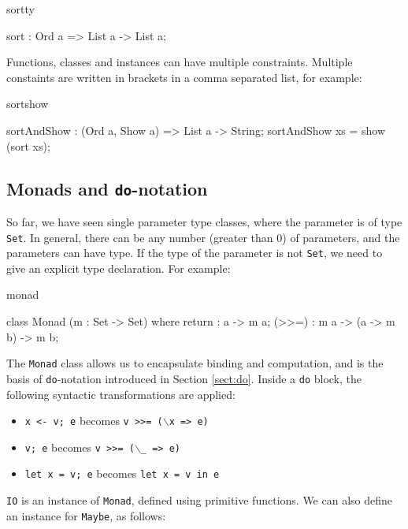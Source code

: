\begin{SaveVerbatim}{sortty}

sort : Ord a => List a -> List a;

\end{SaveVerbatim}

\noindent
Functions, classes and instances can have multiple constraints. Multiple constaints are
written in brackets in a comma separated list, for example:

\begin{SaveVerbatim}{sortshow}

sortAndShow : (Ord a, Show a) => List a -> String;
sortAndShow xs = show (sort xs);

\end{SaveVerbatim}

\subsection{Monads and \texttt{do}-notation}

So far, we have seen single parameter type classes, where the parameter is of type
\texttt{Set}. In general, there can be any number (greater than 0) of parameters,
and the parameters can have  type.
If the type of the parameter is not \texttt{Set}, we need to give an explicit type
declaration. For example:

\begin{SaveVerbatim}{monad}

class Monad (m : Set -> Set) where {
    return : a -> m a;
    (>>=)  : m a -> (a -> m b) -> m b;
}

\end{SaveVerbatim}

\noindent
The \texttt{Monad} class allows us to encapsulate binding and computation, and is the
basis of \texttt{do}-notation introduced in Section \ref{sect:do}. Inside a
\texttt{do} block, the following syntactic transformations are applied:

\begin{itemize}
\item \texttt{x <- v; e} becomes \texttt{v >>= ($\backslash$x => e)}
\item \texttt{v; e} becomes \texttt{v >>= ($\backslash$\_ => e)}
\item \texttt{let x = v; e} becomes \texttt{let x = v in e}
\end{itemize}

\noindent
\texttt{IO} is an instance of \texttt{Monad}, defined using primitive functions.
We can also define an instance for \texttt{Maybe}, as follows:

